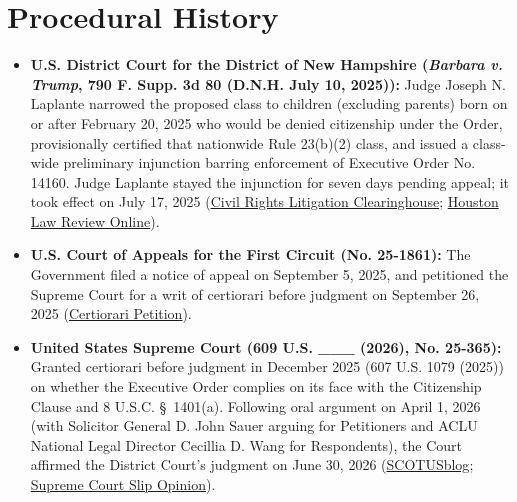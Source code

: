 \documentclass[12pt]{article}
\begin{document}
\section{Procedural History}
\begin{itemize}
\item \textbf{U.S. District Court for the District of New Hampshire (\textit{Barbara v. Trump}, 790 F. Supp. 3d 80 (D.N.H. July 10, 2025)):} Judge Joseph N. Laplante narrowed the proposed class to children (excluding parents) born on or after February 20, 2025 who would be denied citizenship under the Order, provisionally certified that nationwide Rule 23(b)(2) class, and issued a class-wide preliminary injunction barring enforcement of Executive Order No. 14160. Judge Laplante stayed the injunction for seven days pending appeal; it took effect on July 17, 2025 (\href{https://clearinghouse.net/case/46748/}{Civil Rights Litigation Clearinghouse}; \href{https://houstonlawreview.org/article/171991-from-universal-injunctions-to-nationwide-classes-what-_barbara-v-trump_-reveals-about-_casa_-s-remedial-framework.pdf}{Houston Law Review Online}).
\item \textbf{U.S. Court of Appeals for the First Circuit (No. 25-1861):} The Government filed a notice of appeal on September 5, 2025, and petitioned the Supreme Court for a writ of certiorari before judgment on September 26, 2025 (\href{https://www.supremecourt.gov/DocketPDF/25/25-365/378052/20250926163053178_TrumpvBarbaraCertPet.pdf}{Certiorari Petition}).
\item \textbf{United States Supreme Court (609 U.S. \_\_\_ (2026), No. 25-365):} Granted certiorari before judgment in December 2025 (607 U.S. 1079 (2025)) on whether the Executive Order complies on its face with the Citizenship Clause and 8 U.S.C. \S\ 1401(a). Following oral argument on April 1, 2026 (with Solicitor General D. John Sauer arguing for Petitioners and ACLU National Legal Director Cecillia D. Wang for Respondents), the Court affirmed the District Court's judgment on June 30, 2026 (\href{https://www.scotusblog.com/cases/trump-v-barbara/}{SCOTUSblog}; \href{https://www.supremecourt.gov/opinions/25pdf/25-365_4hdj.pdf}{Supreme Court Slip Opinion}).
\end{itemize}
\end{document}
